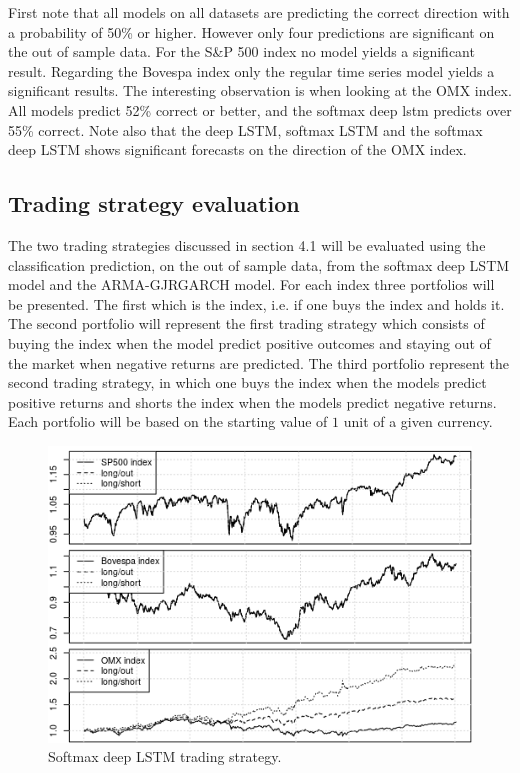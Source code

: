\documentclass[12pt, letterpaper]{amsart}%
\begin{document}
First note that all models on all datasets are predicting the correct direction with a probability of 50\% or higher. However only four predictions are significant on the out of sample data. For the S\&P 500 index no model yields a significant result. Regarding the Bovespa index only the regular time series model yields a significant results. The interesting observation is when looking at the OMX index. All models predict 52\% correct or better, and the softmax deep lstm predicts over 55\% correct. Note also that the deep LSTM, softmax LSTM and the softmax deep LSTM shows significant forecasts on the direction of the OMX index.

\subsection{Trading strategy evaluation}
The two trading strategies discussed in section 4.1 will be evaluated using the classification prediction, on the out of sample data, from the softmax deep LSTM model and the ARMA-GJRGARCH model. For each index three portfolios will be presented. The first which is the index, i.e. if one buys the index and holds it. The second portfolio will represent the first trading strategy which consists of buying the index when the model predict positive outcomes and staying out of the market when negative returns are predicted. The third portfolio represent the second trading strategy, in which one buys the index when the models predict positive returns and shorts the index when the models predict negative returns. Each portfolio will be based on the starting value of $1$ unit of a given currency.
\\

\begin{figure}[h]%
\caption{Softmax deep LSTM trading strategy.}
\centering
\includegraphics[scale=1]{strategy.png}
\end{figure}
\end{document}
